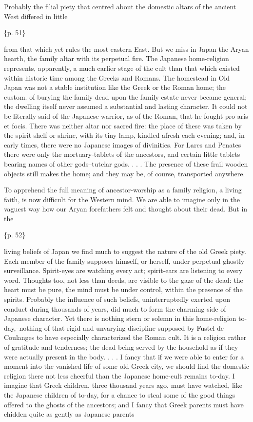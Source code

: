 Probably the filial piety that centred about the domestic altars of the ancient West differed in little

\{p. 51\}

from that which yet rules the most eastern East. But we miss in Japan the Aryan hearth, the family altar with its perpetual fire. The Japanese home-religion represents, apparently, a much earlier stage of the cult than that which existed within historic time among the Greeks and Romans. The homestead in Old Japan was not a stable institution like the Greek or the Roman home; the custom. of burying the family dead upon the family estate never became general; the dwelling itself never assumed a substantial and lasting character. It could not be literally said of the Japanese warrior, as of the Roman, that he fought pro aris et focis. There was neither altar nor sacred fire: the place of these was taken by the spirit-shelf or shrine, with its tiny lamp, kindled afresh each evening; and, in early times, there were no Japanese images of divinities. For Lares and Penates there were only the mortuary-tablets of the ancestors, and certain little tablets bearing names of other gods--tutelar gods. . . . The presence of these frail wooden objects still makes the home; and they may be, of course, transported anywhere.



To apprehend the full meaning of ancestor-worship as a family religion, a living faith, is now difficult for the Western mind. We are able to imagine only in the vaguest way how our Aryan forefathers felt and thought about their dead. But in the

\{p. 52\}

living beliefs of Japan we find much to suggest the nature of the old Greek piety. Each member of the family supposes himself, or herself, under perpetual ghostly surveillance. Spirit-eyes are watching every act; spirit-ears are listening to every word. Thoughts too, not less than deeds, are visible to the gaze of the dead: the heart must be pure, the mind must be under control, within the presence of the spirits. Probably the influence of such beliefs, uninterruptedly exerted upon conduct during thousands of years, did much to form the charming side of Japanese character. Yet there is nothing stern or solemn in this home-religion to-day,--nothing of that rigid and unvarying discipline supposed by Fustel de Coulanges to have especially characterized the Roman cult. It is a religion rather of gratitude and tenderness; the dead being served by the household as if they were actually present in the body. . . . I fancy that if we were able to enter for a moment into the vanished life of some old Greek city, we should find the domestic religion there not less cheerful than the Japanese home-cult remains to-day. I imagine that Greek children, three thousand years ago, must have watched, like the Japanese children of to-day, for a chance to steal some of the good things offered to the ghosts of the ancestors; and I fancy that Greek parents must have chidden quite as gently as Japanese parents

